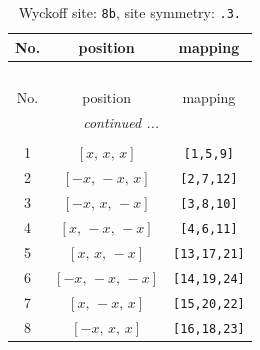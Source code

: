 \documentclass[fleqn,8pt]{jsarticle}
\begin{document}
\renewcommand{\arraystretch}{1.2}
\begin{longtable}{ccc}
\caption{Wyckoff site: {\tt 8b}, site symmetry: {\tt .3.}}
 \\
 \hline \hline
No. & position & mapping \\ \hline \endfirsthead

\multicolumn{2}{l}{\tablename\ \thetable{}} \\
 \hline \hline
No. & position & mapping \\ \hline \endhead

 \hline \hline
\multicolumn{2}{r}{\footnotesize\it continued ...} \\ \endfoot

 \hline \hline
\multicolumn{2}{r}{} \\ \endlastfoot

1 & $\left[ x,\, x,\, x \right]$ & {\tt [1,5,9]} \\ \hline
2 & $\left[ - x,\, - x,\, x \right]$ & {\tt [2,7,12]} \\ \hline
3 & $\left[ - x,\, x,\, - x \right]$ & {\tt [3,8,10]} \\ \hline
4 & $\left[ x,\, - x,\, - x \right]$ & {\tt [4,6,11]} \\ \hline
5 & $\left[ x,\, x,\, - x \right]$ & {\tt [13,17,21]} \\ \hline
6 & $\left[ - x,\, - x,\, - x \right]$ & {\tt [14,19,24]} \\ \hline
7 & $\left[ x,\, - x,\, x \right]$ & {\tt [15,20,22]} \\ \hline
8 & $\left[ - x,\, x,\, x \right]$ & {\tt [16,18,23]} \\
\end{longtable}
\renewcommand{\arraystretch}{1.2}
\end{document}

